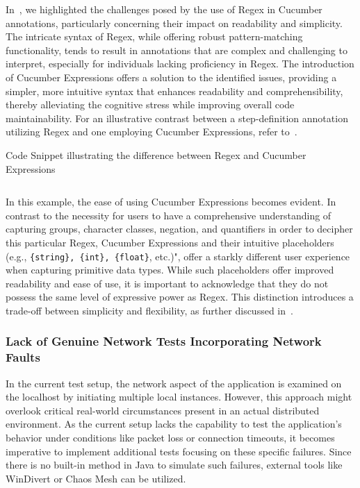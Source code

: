 In~, we highlighted the challenges posed by the use of \ac{Regex} in Cucumber annotations, particularly concerning their impact on readability and simplicity. The intricate syntax of \ac{Regex}, while offering robust pattern-matching functionality, tends to result in annotations that are complex and challenging to interpret, especially for individuals lacking proficiency in \ac{Regex}. The introduction of Cucumber Expressions offers a solution to the identified issues, providing a simpler, more intuitive syntax that enhances readability and comprehensibility, thereby alleviating the cognitive stress while improving overall code maintainability. For an illustrative contrast between a step-definition annotation utilizing \ac{Regex} and one employing Cucumber Expressions, refer to~.

\begin{listing}[!ht]
\caption{Code Snippet illustrating the difference between \ac{Regex} and Cucumber Expressions}
\label{lst:simpleRegex}
\inputminted{java}{files/code/simpleRegex.java}
\end{listing}

In this example, the ease of using Cucumber Expressions becomes evident. In contrast to the necessity for users to have a comprehensive understanding of capturing groups, character classes, negation, and quantifiers in order to decipher this particular \ac{Regex}, Cucumber Expressions and their intuitive placeholders (e.g., \verb|{string}, {int}, {float}|, etc.)", offer a starkly different user experience when capturing primitive data types. While such placeholders offer improved readability and ease of use, it is important to acknowledge that they do not possess the same level of expressive power as \ac{Regex}. This distinction introduces a trade-off between simplicity and flexibility, as further discussed in~. 


\subsubsection{Lack of Genuine Network Tests Incorporating Network Faults}
\label{sub:lack-network-tests}

In the current test setup, the network aspect of the application is examined on the localhost by initiating multiple local instances. However, this approach might overlook critical real-world circumstances present in an actual distributed environment. As the current setup lacks the capability to test the application's behavior under conditions like packet loss or connection timeouts, it becomes imperative to implement additional tests focusing on these specific failures. Since there is no built-in method in Java to simulate such failures, external tools like WinDivert or Chaos Mesh can be utilized.

